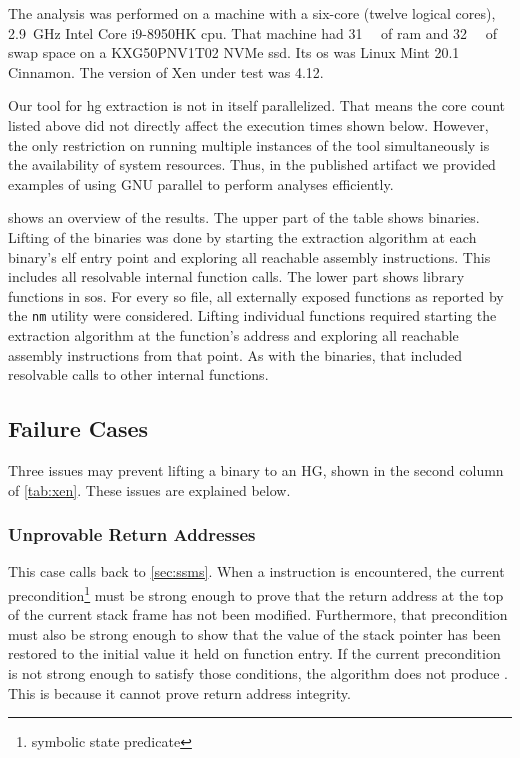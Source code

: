 The analysis was performed on a machine with a six-core (twelve logical cores), \SI{2.9}{\giga\hertz} Intel Core i9-8950HK \ac{cpu}.
That machine had \SI{31}{\gibi\byte} of \ac{ram}
and \SI{32}{\gibi\byte} of swap space on a KXG50PNV1T02 NVMe \ac{ssd}.
Its \ac{os} was Linux Mint 20.1 Cinnamon.
The version of Xen under test was 4.12.
\begin{remark}[Parallelization]
  Our tool for \ac{hg} extraction is not in itself parallelized.
  That means the core count listed above did not directly affect the execution times shown below.
  However, the only restriction on running multiple instances of the tool simultaneously is the availability of system resources.
  Thus, in the published artifact \autocite{bockenek2022artifact} we provided examples of using GNU parallel \autocite{Tange2011a} to perform analyses efficiently.
\end{remark}

 shows an overview of the results.
The upper part of the table shows binaries.
Lifting of the binaries was done by starting the extraction algorithm at each binary's \ac{elf} entry point and exploring all reachable assembly instructions.
This includes all resolvable internal function calls.
The lower part shows library functions in \acp{so}.
For every \ac{so} file, all externally exposed functions as reported by the \lstinline|nm| utility were considered.
Lifting individual functions required starting the extraction algorithm at the function's address and exploring all reachable assembly instructions from that point.
As with the binaries, that included resolvable calls to other internal functions.

\subsection{Failure Cases}
Three issues may prevent lifting a binary to an HG, shown in the second column of \cref{tab:xen}. These issues are explained below.

\subsubsection{Unprovable Return Addresses}
This case calls back to \cref{sec:ssms}.
When a  instruction is encountered,
the current precondition\footnote{symbolic state predicate}
must be strong enough to prove that the return address at the top of the current stack frame has not been modified.
Furthermore, that precondition must also be strong enough to show that the value of the stack pointer has been restored to the initial value it held on function entry.
If the current precondition is not strong enough to satisfy those conditions, the algorithm does not produce .
This is because it cannot prove return address integrity.

